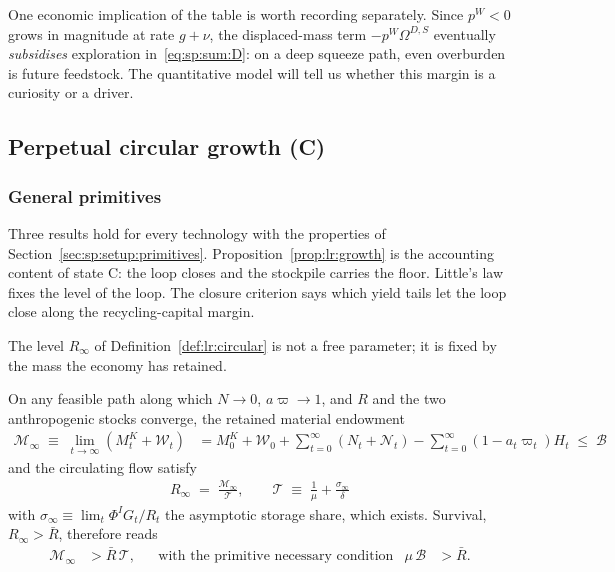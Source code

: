 One economic implication of the table is worth recording separately. Since $p^W<0$ grows in magnitude at rate $g+\nu$, the displaced-mass term $-p^W\Omega^{D,S}$ eventually \emph{subsidises} exploration in~\eqref{eq:sp:sum:D}: on a deep squeeze path, even overburden is future feedstock. The quantitative model will tell us whether this margin is a curiosity or a driver.

\subsection{Perpetual circular growth (C)}\label{sec:app:proofs:circular}

\subsubsection{General primitives}\label{sec:app:proofs:circular:general}

Three results hold for every technology with the properties of Section~\ref{sec:sp:setup:primitives}. Proposition~\ref{prop:lr:growth} is the accounting content of state C: the loop closes and the stockpile carries the floor. Little's law fixes the level of the loop. The closure criterion says which yield tails let the loop close along the recycling-capital margin.

 The level $R_\infty$ of Definition~\ref{def:lr:circular} is not a free parameter; it is fixed by the mass the economy has retained.

\begin{lemma}\label{lem:app:pf:little}
On any feasible path along which $N\to0$, $a\varpi\to1$, and $R$ and the two anthropogenic stocks converge, the retained material endowment
\begin{align}
\mathcal M_\infty \;\equiv\; \lim_{t\to\infty}\left(M^K_t+\mathcal W_t\right)
&= M^K_0+\mathcal W_0+\sum_{t=0}^\infty\left(N_t+\mathcal N_t\right)-\sum_{t=0}^\infty\left(1-a_t\varpi_t\right)H_t
\;\le\;\mathcal B
\label{eq:app:wh:cbgp:retained}
\end{align}
and the circulating flow satisfy
\begin{align}
\boxed{\;R_\infty \;=\; \frac{\mathcal M_\infty}{\mathcal T},
\qquad
\mathcal T \;\equiv\; \frac{1}{\mu}+\frac{\sigma_\infty}{\delta}\;}
\label{eq:app:wh:cbgp:little}
\end{align}
with $\sigma_\infty\equiv\lim_t\Phi^IG_t/R_t$ the asymptotic storage share, which exists. Survival, $R_\infty>\bar R$, therefore reads
\begin{align}
\mathcal M_\infty &> \bar R\,\mathcal T,
&&\text{with the primitive necessary condition}
&
\mu\,\mathcal B &> \bar R .
\label{eq:app:wh:cbgp:survival}
\end{align}
\end{lemma}

